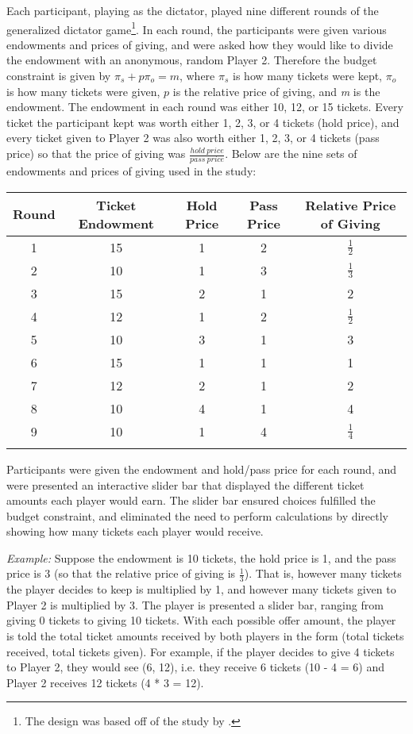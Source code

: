 \documentclass[12pt]{article}
\begin{document}
Each participant, playing as the dictator, played nine different rounds of the generalized dictator game\footnote{The design was based off of the study by \cite{andreoni_miller_2002}.}. In each round, the participants were given various endowments and prices of giving, and were asked how they would like to divide the endowment with an anonymous, random Player 2. Therefore the budget constraint is given by \(\pi_{s} + p\pi_{o} = \textit{m}\), where \(\pi_{s}\) is how many tickets were kept, \(\pi_{o}\) is how many tickets were given, \(p\) is the relative price of giving, and \textit{m} is the endowment. The endowment in each round was either 10, 12, or 15 tickets. Every ticket the participant kept was worth either 1, 2, 3, or 4 tickets (hold price), and every ticket given to Player 2 was also worth either 1, 2, 3, or 4 tickets (pass price) so that the price of giving was \(\frac{hold \ price}{pass \ price}\). Below are the nine sets of endowments and prices of giving used in the study:

\begin{center}
\begin{tabular}{ c c c c c }
\hline \hline
 Round & Ticket Endowment & Hold Price & Pass Price & Relative Price of Giving \\ 
 \hline
1 & 15 & 1 & 2 & \(\frac{1}{2}\)  \\  
2 & 10 & 1 & 3 & \(\frac{1}{3}\)  \\  
3 & 15 & 2 & 1 & 2 \\  
4 & 12 & 1 & 2 & \(\frac{1}{2}\)  \\  
5 & 10 & 3 & 1 & 3  \\  
6 & 15 & 1 & 1 & 1  \\  
7 & 12 & 2 & 1 & 2 \\  
8 & 10 & 4 & 1 & 4 \\  
9 & 10 & 1 & 4 & \(\frac{1}{4}\)  \\ 
\hline \hline \\
\end{tabular}
\end{center}

Participants were given the endowment and hold/pass price for each round, and were presented an interactive slider bar that displayed the different ticket amounts each player would earn. The slider bar ensured choices fulfilled the budget constraint, and eliminated the need to perform calculations by directly showing how many tickets each player would receive.

\textit{Example:} Suppose the endowment is 10 tickets, the hold price is 1, and the pass price is 3 (so that the relative price of giving is \(\frac{1}{3}\)). That is, however many tickets the player decides to keep is multiplied by 1, and however many tickets given to Player 2 is multiplied by 3. The player is presented a slider bar, ranging from giving 0 tickets to giving 10 tickets. With each possible offer amount, the player is told the total ticket amounts received by both players in the form (total tickets received, total tickets given). For example, if the player decides to give 4 tickets to Player 2, they would see (6, 12), i.e. they receive 6 tickets (10 - 4 = 6) and Player 2 receives 12 tickets (4 * 3 = 12).
\end{document}
